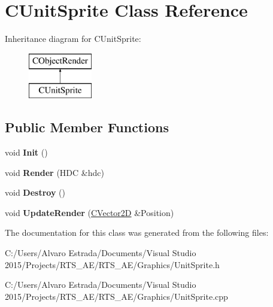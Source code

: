 \hypertarget{class_c_unit_sprite}{}\section{C\+Unit\+Sprite Class Reference}
\label{class_c_unit_sprite}
Inheritance diagram for C\+Unit\+Sprite\+:\begin{figure}[H]
\begin{center}
\leavevmode
\includegraphics[height=2.000000cm]{class_c_unit_sprite}
\end{center}
\end{figure}
\subsection*{Public Member Functions}
\begin{DoxyCompactItemize}
\item 
void {\bfseries Init} ()\hypertarget{class_c_unit_sprite_a5f84dc67f2875f72c6a4030a1cf1b1ce}{}\label{class_c_unit_sprite_a5f84dc67f2875f72c6a4030a1cf1b1ce}

\item 
void {\bfseries Render} (H\+DC \&hdc)\hypertarget{class_c_unit_sprite_a708ce15c2690f7184f3ab5fce5f67076}{}\label{class_c_unit_sprite_a708ce15c2690f7184f3ab5fce5f67076}

\item 
void {\bfseries Destroy} ()\hypertarget{class_c_unit_sprite_aae33508fda0cbe5c51b0019d8cf1afb2}{}\label{class_c_unit_sprite_aae33508fda0cbe5c51b0019d8cf1afb2}

\item 
void {\bfseries Update\+Render} (\hyperlink{struct_c_vector2_d}{C\+Vector2D} \&Position)\hypertarget{class_c_unit_sprite_a3d19eb9e1224358fbb8d8b408e9d43c6}{}\label{class_c_unit_sprite_a3d19eb9e1224358fbb8d8b408e9d43c6}

\end{DoxyCompactItemize}


The documentation for this class was generated from the following files\+:\begin{DoxyCompactItemize}
\item 
C\+:/\+Users/\+Alvaro Estrada/\+Documents/\+Visual Studio 2015/\+Projects/\+R\+T\+S\+\_\+\+A\+E/\+R\+T\+S\+\_\+\+A\+E/\+Graphics/Unit\+Sprite.\+h\item 
C\+:/\+Users/\+Alvaro Estrada/\+Documents/\+Visual Studio 2015/\+Projects/\+R\+T\+S\+\_\+\+A\+E/\+R\+T\+S\+\_\+\+A\+E/\+Graphics/Unit\+Sprite.\+cpp\end{DoxyCompactItemize}
